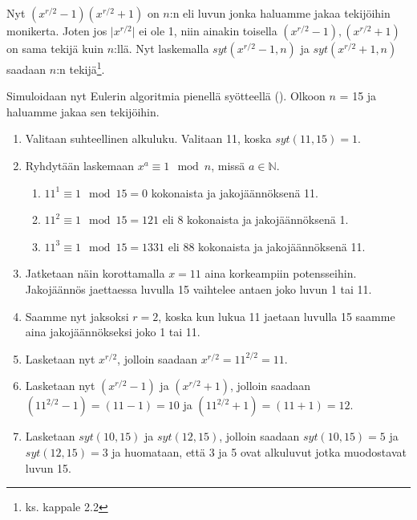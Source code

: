 Nyt $(x^{r/2} - 1)(x^{r/2} + 1)$ on $n$:n eli luvun jonka haluamme jakaa tekijöihin monikerta. Joten jos $\lvert x^{r/2} \rvert$ ei ole 1, niin ainakin toisella $(x^{r/2} - 1), (x^{r/2} + 1)$ on sama tekijä kuin $n$:llä. Nyt laskemalla $syt(x^{r/2} - 1, n)$ ja $syt(x^{r/2} + 1, n)$ saadaan $n$:n tekijä\footnote{ks. kappale 2.2}.

Simuloidaan nyt Eulerin algoritmia pienellä syötteellä (\cite{doi:10.1080/23742917.2016.1226650}). Olkoon $n$ = 15 ja haluamme jakaa sen tekijöihin.

\begin{enumerate}
    \item Valitaan suhteellinen alkuluku. Valitaan 11, koska $syt(11,15) = 1$.
    
    \item Ryhdytään laskemaan $x^{a} \equiv 1 \mod n$, missä $a \in \mathbb{N}$.
    
    \begin{enumerate}
    
        \item $11^{1} \equiv 1 \mod 15 = 0$ kokonaista ja jakojäännöksenä 11.
        
        \item $11^{2} \equiv 1 \mod 15 = 121$ eli 8 kokonaista ja jakojäännöksenä 1.
        
        \item $11^{3} \equiv 1 \mod 15 = 1331$ eli 88 kokonaista ja jakojäännöksenä 11.
    \end{enumerate}
    
    \item Jatketaan näin korottamalla $x = 11$ aina korkeampiin potensseihin. Jakojäännös jaettaessa luvulla 15 vaihtelee antaen joko luvun 1 tai 11.
    
    \item Saamme nyt jaksoksi $r = 2$, koska kun lukua 11 jaetaan luvulla 15 saamme aina jakojäännökseksi joko 1 tai 11.
    
    \item Lasketaan nyt $x^{r/2}$, jolloin saadaan $x^{r/2} = 11^{2/2} = 11$.
    
    \item Lasketaan nyt $(x^{r/2}-1)$ ja $(x^{r/2}+1)$, jolloin saadaan $(11^{2/2} - 1) = (11 - 1) = 10$ ja $(11^{2/2} + 1) = (11 + 1) = 12$.
    
    \item Lasketaan $syt(10,15)$ ja $syt(12,15)$, jolloin saadaan $syt(10,15) = 5$ ja $syt(12,15) = 3$ ja huomataan, että 3 ja 5 ovat alkuluvut jotka muodostavat luvun 15.
    
\end{enumerate}

